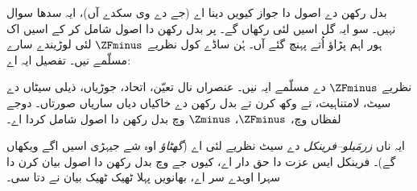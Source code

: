 \documentclass[../../../include/open-logic-section]{subfiles}
\begin{document}

بدل رکھن دے اصول دا جواز کیویں دینا اے (جے دے وی سکدے آں)، ایہ سدھا
سوال نہیں۔ سو ایہ گل اسیں  لئی رکھاں گے۔
پر بدل رکھن دا اصول شامل کر کے اسیں اک ہور اہم پڑاؤ اُتے پہنچ گئے آں۔
ہُن ساڈے کول نظریے $\ZFminus$ لئی لوڑیندے سارے مسلّمے نیں۔ تفصیل ایہ اے:

\begin{defn}
نظریے $\ZFminus$ دے مسلّمے ایہ نیں۔ عنصراں نال تعیّن، اتحاد، جوڑیاں،
ذیلی سیٹاں دے سیٹ، لامتناہیت، تے وکھ کرن تے بدل رکھن دے خاکیاں دیاں
ساریاں صورتاں۔ دوجے لفظاں وچ، $\ZFminus$، $\Zminus$ وچ بدل رکھن
دا اصول شامل کردا اے۔
\end{defn}
\noindent
ایہ ناں \emph{زرمَیلو--فرینکل} دے سیٹ نظریے لئی اے (\emph{گھٹاؤ}
اوہ شے جیہڑی اسیں اگے ویکھاں گے)۔ فرینکل ایس عزت دا حق دار اے، کیوں
جے \citeyear{Fraenkel1922} وچ بدل رکھن دا اصول بیان کرن دا سہرا اوہدے
سر اے، بھانویں پہلا ٹھیک ٹھیک بیان \citet{Skolem1922} نے دتا سی۔
\end{document}
